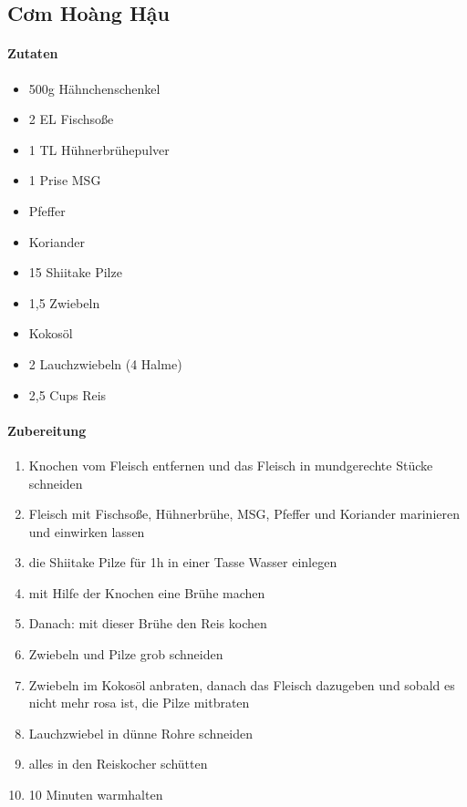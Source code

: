 \newpage
{}
\subsection{Cơm Hoàng Hậu}
\paragraph{Zutaten}
\begin{itemize}[noitemsep]
	\item 500g Hähnchenschenkel
	\item 2 EL Fischsoße
	\item 1 TL Hühnerbrühepulver
	\item 1 Prise MSG
	\item Pfeffer
	\item Koriander
	\item 15 Shiitake Pilze
	\item 1,5 Zwiebeln
	\item Kokosöl 
	\item 2 Lauchzwiebeln (4 Halme)
	\item 2,5 Cups Reis
\end{itemize}
\paragraph{Zubereitung}
\begin{enumerate}[noitemsep]
	\item Knochen vom Fleisch entfernen und das Fleisch in mundgerechte Stücke schneiden
	\item Fleisch mit Fischsoße, Hühnerbrühe, MSG, Pfeffer und Koriander marinieren und einwirken lassen
	\item die Shiitake Pilze für 1h in einer Tasse Wasser einlegen
	\item mit Hilfe der Knochen eine Brühe machen
	\item Danach: mit dieser Brühe den Reis kochen
	\item Zwiebeln und Pilze grob schneiden
	\item Zwiebeln im Kokosöl anbraten, danach das Fleisch dazugeben und sobald es nicht mehr rosa ist, die Pilze mitbraten
	\item Lauchzwiebel in dünne Rohre schneiden
	\item alles in den Reiskocher schütten
	\item 10 Minuten warmhalten 
\end{enumerate}
